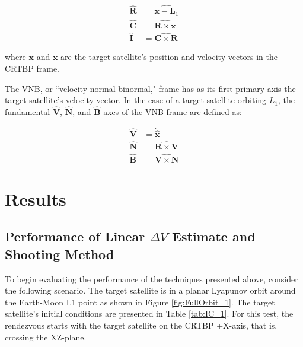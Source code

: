 \documentclass[a4paper]{article}
\begin{document}
\begin{equation} \label{eq:RIC}
\begin{aligned}
\mathbf{\hat{R}} &= \widehat{\mathbf{x} - \mathbf{L}_1} \\
\mathbf{\hat{C}} &= \widehat{\mathbf{R} \times \mathbf{\dot{x}}} \\
\mathbf{\hat{I}} \, &= \widehat{\mathbf{C} \times \mathbf{R}}
\end{aligned}
\end{equation}

where \(\mathbf{x}\) and \(\mathbf{\dot{x}}\) are the target satellite's position and velocity vectors in the CRTBP frame.

The VNB, or ``velocity-normal-binormal," frame has as its first primary axis the target satellite's velocity vector.  In the case of a target satellite orbiting \(L_1\), the fundamental \(\mathbf{\hat{V}}\), \(\mathbf{\hat{N}}\), and \(\mathbf{\hat{B}}\) axes of the VNB frame are defined as:

\begin{equation} \label{eq:VNB}
\begin{aligned}
\mathbf{\hat{V}} &= \mathbf{\dot{\hat{x}}} \\
\mathbf{\hat{N}} &= \widehat{\mathbf{R} \times \mathbf{V}}  \\
\mathbf{\hat{B}} &= \widehat{\mathbf{V} \times \mathbf{N}} 
\end{aligned}
\end{equation}

\section{Results}

\subsection{Performance of Linear \(\Delta V\) Estimate and Shooting Method}

To begin evaluating the performance of the techniques presented above, consider the following scenario.  The target satellite is in a planar Lyapunov orbit around the Earth-Moon L1 point as shown in Figure \ref{fig:FullOrbit_1}.  The target satellite's initial conditions are presented in Table \ref{tab:IC_1}.  For this test, the rendezvous starts with the target satellite on the CRTBP +X-axis, that is, crossing the XZ-plane.
\end{document}
